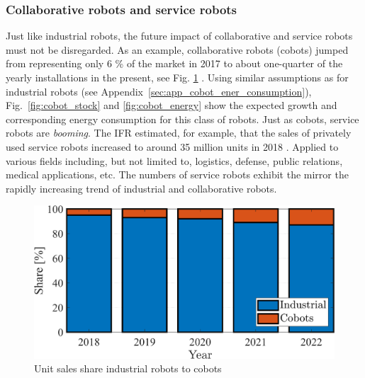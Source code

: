 \subsubsection{Collaborative robots and service robots}
Just like industrial robots, the future impact of collaborative and service robots must not be disregarded. As an example, collaborative robots (cobots) jumped from representing only 6 \% of the market in 2017 to about one-quarter of the yearly installations in the present, see Fig. \ref{fig:industrial_cobot_share} \cite{tobe2015}. Using similar assumptions as for industrial robots (see Appendix~\ref{sec:app_cobot_ener_consumption}), Fig.~\ref{fig:cobot_stock} and \ref{fig:cobot_energy} show the expected growth and corresponding energy consumption for this class of robots. Just as cobots, service robots are \textit{booming}. The IFR estimated, for example, that the sales of privately used service robots increased to around 35 million units in 2018 \cite{IFR2015}. Applied to various fields including, but not limited to, logistics, defense, public relations, medical applications, etc. The numbers of service robots exhibit the mirror the rapidly increasing trend of industrial and collaborative robots.
\begin{figure}[!t]
	\centering
	\includegraphics[width= 0.9\columnwidth]{fig/share_industrial_and_cobots.png} 
	\caption{Unit sales share industrial robots to cobots \cite{statista_ir_cobot_share}}
	\label{fig:industrial_cobot_share}
\end{figure}

